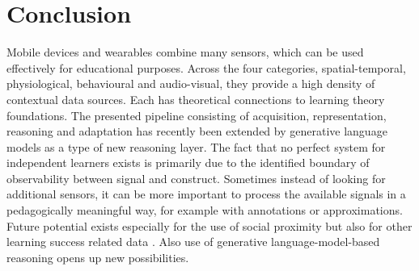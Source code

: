 \documentclass[runningheads]{llncs}
\begin{document}
\section{Conclusion}

Mobile devices and wearables combine many sensors, which can be used effectively for educational purposes. Across the four categories, spatial-temporal, physiological, behavioural and audio-visual, they provide a high density of contextual data sources.
Each has theoretical connections to learning theory foundations. The presented pipeline consisting of acquisition, representation, reasoning and adaptation has recently been extended by generative language models as a type of new reasoning layer.
The fact that no perfect system for independent learners exists is primarily due to the identified boundary of observability between signal and construct. Sometimes instead of looking for additional sensors, it can be more important to process the available signals in a pedagogically meaningful way, for example with annotations or approximations.
Future potential exists especially for the use of social proximity but also for other learning success related data . Also use of generative language-model-based reasoning opens up new possibilities.


\end{document}
